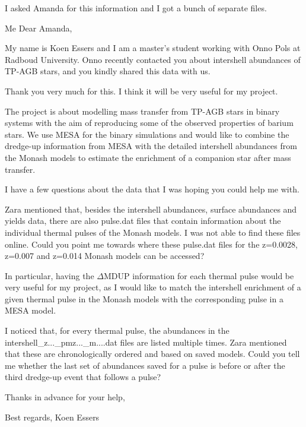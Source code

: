 \documentclass[a4paper,10pt]{article}
\begin{document}
I asked Amanda for this information and I got a bunch of separate files.
\begin{minipage}{1.55\textwidth}
\begin{shadequote}{Me}
Dear Amanda,

My name is Koen Essers and I am a master's student working with Onno Pols at Radboud University. Onno recently contacted you about intershell abundances of TP-AGB stars, and you kindly shared this data with us.

Thank you very much for this. I think it will be very useful for my project.

The project is about modelling mass transfer from TP-AGB stars in binary systems with the aim of reproducing some of the observed properties of barium stars. We use MESA for the binary simulations and would like to combine the dredge-up information from MESA with the detailed intershell abundances from the Monash models to estimate the enrichment of a companion star after mass transfer.

I have a few questions about the data that I was hoping you could help me with.

\begin{enumd}
    \item  Zara mentioned that, besides the intershell abundances, surface abundances and yields data, there are also pulse.dat files that contain information about the individual thermal pulses of the Monash models. I was not able to find these files online. Could you point me towards where these pulse.dat files for the z=0.0028, z=0.007 and z=0.014 Monash models can be accessed?

In particular, having the \(\Delta\)MDUP information for each thermal pulse would be very useful for my project, as I would like to match the intershell enrichment of a given thermal pulse in the Monash models with the corresponding pulse in a MESA model.
    \item  I noticed that, for every thermal pulse, the abundances in the intershell\_z...\_pmz...\_m....dat files are listed multiple times. Zara mentioned that these are chronologically ordered and based on saved models. Could you tell me whether the last set of abundances saved for a pulse is before or after the third dredge-up event that follows a pulse?
\end{enumd}

Thanks in advance for your help,

Best regards,
Koen Essers
\end{shadequote}
\end{minipage}
\end{document}
